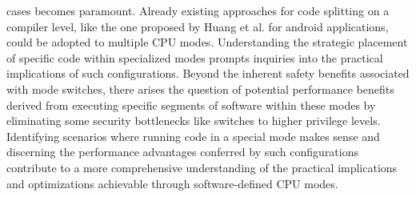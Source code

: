 cases becomes paramount. Already existing approaches for code splitting on a
compiler level, like the one proposed by Huang et al.\cite{HSB} for android applications,
could be adopted to multiple CPU modes. Understanding the strategic placement of specific code
within specialized modes prompts inquiries into the practical implications of
such configurations. Beyond the inherent safety benefits associated with mode
switches, there arises the question of potential performance benefits derived
from executing specific segments of software within these modes by eliminating
some security bottlenecks like switches to higher privilege levels. Identifying
scenarios where running code in a special mode makes sense and discerning the
performance advantages conferred by such configurations contribute to a more
comprehensive understanding of the practical implications and optimizations
achievable through software-defined CPU modes.